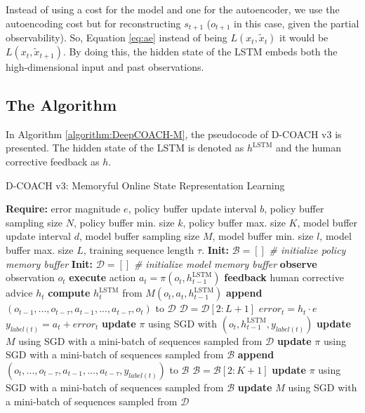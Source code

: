 Instead of using a cost for the model and one for the autoencoder, we use the autoencoding cost but for reconstructing $s_{t+1}$ ($o_{t+1}$ in this case, given the partial observability). So, Equation \ref{eq:ae} instead of being $L(x_{t},\widetilde x_{t})$ it would be  $L(x_{t},\widetilde x_{t+1})$. By doing this, the hidden state of the LSTM embeds both the high-dimensional input and past observations.
\newpage

\subsection{The Algorithm}

In Algorithm \ref{algorithm:DeepCOACH-M}, the pseudocode of D-COACH v3 is presented. The hidden state of the LSTM is denoted as  $h^{\mathrm{LSTM}}$ and the human corrective feedback as  $h$.

\begin{algorithm}[h]
\caption{D-COACH v3: Memoryful Online State Representation Learning}\label{algorithm:DeepCOACH-M}
\begin{algorithmic}[1]
\State \textbf{Require:} error magnitude $e$, policy buffer update interval $b$, policy buffer sampling size $N$, policy buffer min. size $k$, policy buffer max. size $K$, model buffer update interval $d$, model buffer sampling size $M$, model buffer min. size $l$, model buffer max. size $L$, training sequence length $\tau$.
\State \textbf{Init:} $\mathcal{B} = []$  \emph{\# initialize policy memory buffer}
\State \textbf{Init:} $\mathcal{D} = []$  \emph{\# initialize model memory buffer}
\State \textbf{observe} observation $o_{t}$
\State \textbf{execute} action $a_{t}=\pi(o_{t}, h^{\mathrm{LSTM}}_{t-1})$
\State \textbf{feedback} human corrective advice $h_{t}$
\State \textbf{compute} $h^{\mathrm{LSTM}}_{t}$ from $M(o_{t}, a_{t},h^{\mathrm{LSTM}}_{t-1})$
\State \textbf{append} $(o_{t-1},...,o_{t-\tau},a_{t-1},...,a_{t-\tau},o_{t})$ to $\mathcal{D}$
\State $\mathcal{D} = \mathcal{D}[2:L+1]$
\EndIf
{}
\State $\mathit{error}_{t} = h_{t}\cdot e$
\State $y_{label(t)} = a_{t} + \mathit{error}_{t}$ 
\State \textbf{update} $\pi$ using SGD with $(o_{t}, h^{\mathrm{LSTM}}_{t-1}, y_{\mathit{label}(t)})$ 
\State \textbf{update} $M$ using SGD with a mini-batch of sequences sampled from $\mathcal{D}$
\State \textbf{update} $\pi$ using SGD with a mini-batch of sequences sampled from $\mathcal{B}$
\State \textbf{append} $(o_{t},...,o_{t-\tau},a_{t-1},...,a_{t-\tau}, y_{\mathit{label}(t)})$ to $\mathcal{B}$
\State $\mathcal{B} = \mathcal{B}[2:K+1]$
\EndIf
\EndIf
{}
\State \textbf{update} $\pi$ using SGD with a mini-batch of sequences sampled from $\mathcal{B}$
\EndIf
{}
\State \textbf{update} $M$ using SGD with a mini-batch of sequences sampled from $\mathcal{D}$
\EndIf
\EndFor
\end{algorithmic}
\end{algorithm}


